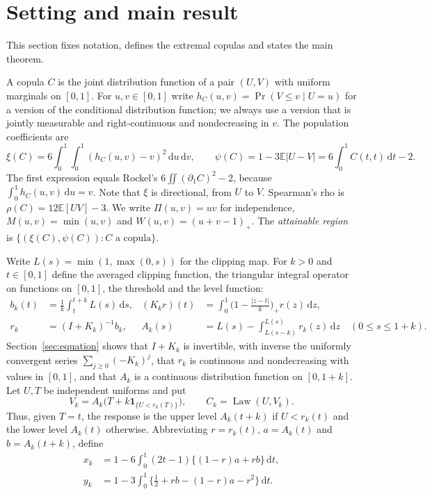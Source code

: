 \documentclass[11pt,a4paper]{article}
\theoremstyle{remark}
\newcommand{\E}{\mathbb E}
\newcommand{\1}{\mathbf 1}
\newcommand{\dd}{\,\mathrm d}
\DeclareMathOperator{\Law}{Law}
\begin{document}
\section{Setting and main result}\label{sec:main}
This section fixes notation, defines the extremal copulas and states the main theorem.

A copula $C$ is the joint distribution function of a pair $(U,V)$ with uniform marginals on $[0,1]$. For $u,v\in[0,1]$ write $h_C(u,v)=\Pr(V\le v\mid U=u)$ for a version of the conditional distribution function; we always use a version that is jointly measurable and right-continuous and nondecreasing in $v$. The population coefficients are
\[
 \xi(C)=6\int_0^1\!\int_0^1 (h_C(u,v)-v)^2\dd u\dd v,
 \qquad \psi(C)=1-3\E|U-V|=6\int_0^1C(t,t)\dd t-2 .
\]
The first expression equals Rockel's $6\iint(\partial_1C)^2-2$, because $\int_0^1h_C(u,v)\dd u=v$. Note that $\xi$ is directional, from $U$ to $V$. Spearman's rho is $\rho(C)=12\E[UV]-3$. We write $\Pi(u,v)=uv$ for independence, $M(u,v)=\min(u,v)$ and $W(u,v)=(u+v-1)_+$. The \emph{attainable region} is $\{(\xi(C),\psi(C)): C \text{ a copula}\}$.

Write $L(s)=\min(1,\max(0,s))$ for the clipping map. For $k>0$ and $t\in[0,1]$ define the averaged clipping function, the triangular integral operator on functions on $[0,1]$, the threshold and the level function:
\begin{align}
 b_k(t)&=\frac1k\int_t^{t+k}L(s)\dd s, &
 (K_kr)(t)&=\int_0^1\Big(1-\frac{|z-t|}{k}\Big)_+r(z)\dd z, \label{kernel}\\
 r_k&=(I+K_k)^{-1}b_k, &
 A_k(s)&=L(s)-\int_{L(s-k)}^{L(s)}r_k(z)\dd z\quad(0\le s\le1+k).\label{solution}
\end{align}
Section~\ref{sec:equation} shows that $I+K_k$ is invertible, with inverse the uniformly convergent series $\sum_{j\ge0}(-K_k)^j$, that $r_k$ is continuous and nondecreasing with values in $[0,1]$, and that $A_k$ is a continuous distribution function on $[0,1+k]$. Let $U,T$ be independent uniforms and put
\[
 V_k=A_k\big(T+k\1_{\{U<r_k(T)\}}\big),\qquad C_k=\Law(U,V_k).
\]
Thus, given $T=t$, the response is the upper level $A_k(t+k)$ if $U<r_k(t)$ and the lower level $A_k(t)$ otherwise. Abbreviating $r=r_k(t)$, $a=A_k(t)$ and $b=A_k(t+k)$, define
\begin{align}
 x_k&=1-6\int_0^1(2t-1)\{(1-r)a+rb\}\dd t,\label{xformula}\\
 y_k&=1-3\int_0^1\{\tfrac12+rb-(1-r)a-r^2\}\dd t.\label{yformula}
\end{align}
\end{document}
